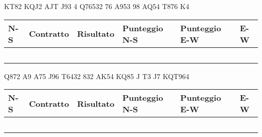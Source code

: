 \documentclass[a4paper,italian,12pt]{article}
\begin{document}
\begin{tcolorbox}
\begin{minipage}{.3\textwidth}
\newgame
{}
     {KT82} {KQJ2} {AJT}
     {J93} {4} {Q76532}
     {76} {A953} {98}
     {AQ54} {T876} {K4}

    \hspace{-.2cm}\showAll
\end{minipage}
\begin{minipage}{.7\textwidth}

\renewcommand{\arraystretch}{2}
\begin{tabular}{|l|l|l|l|l|l|}
\hline
N-S & Contratto\hspace{1.5cm} & Risultato& Punteggio N-S & Punteggio E-W & E-W\\\hline
  &&&&&\\\hline
   &&&&&\\\hline
    &&&&&\\\hline
     &&&&&\\\hline
          &&&&&\\\hline
\end{tabular}
\end{minipage}
\end{tcolorbox}

\medskip

\begin{tcolorbox}
\begin{minipage}{.3\textwidth}
\newgame
{}
     {Q872} {A9} {A75}
     {J96} {T6432} {832}
     {AK54} {KQ85} {J}
     {T3} {J7} {KQT964}
    \hspace{-.2cm}\showAll
\end{minipage}
\begin{minipage}{.7\textwidth}

\renewcommand{\arraystretch}{2}
\begin{tabular}{|l|l|l|l|l|l|}
\hline
N-S & Contratto\hspace{1.5cm} & Risultato& Punteggio N-S & Punteggio E-W & E-W\\\hline
  &&&&&\\\hline
   &&&&&\\\hline
    &&&&&\\\hline
     &&&&&\\\hline
          &&&&&\\\hline
\end{tabular}
\end{minipage}
\end{tcolorbox}
\end{document}
